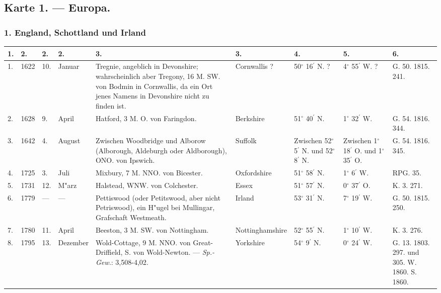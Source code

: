 \documentclass[a4paper, 8pt, oneside, polutonikogreek, german]{article}
\begin{document}
\subsection{Karte 1. --- Europa.}
\subsubsection{1. England, Schottland und Irland}
\begin{center}
    \footnotesize
    \begin{longtable}{|p{3mm}|p{10mm}|p{3mm}|p{15mm}|p{30mm}|p{25mm}|p{13mm}|p{13mm}|p{13mm}|}
    \hline
        1. & 2. & 2. & 2. & 3. & 3. & 4. & 5. & 6. \\ \hline
        1. & 1622 & 10. & Januar & Tregnie, angeblich in Devonshire; wahrscheinlich aber Tregony, 16 M. SW. von Bodmin in Cornwallis, da ein Ort jenes Namens in Devonshire nicht zu finden ist. & Cornwallis ? & 50$^\circ$ 16$^\prime$ N. ? & 4$^\circ$ 55$^\prime$ W. ? & G. 50. 1815. 241. \\ \hline
        2. & 1628 & 9. & April & Hatford, 3 M. O. von Faringdon. & Berkshire & 51$^\circ$ 40$^\prime$ N. & 1$^\circ$ 32$^\prime$ W. & G. 54. 1816. 344. \\ \hline
        3. & 1642 & 4. & August & Zwischen Woodbridge und Alborow (Alborough, Aldeburgh oder Aldborough), ONO. von Ipswich. & Suffolk & Zwischen 52$^\circ$ 5$^\prime$ N. und 52$^\circ$ 8$^\prime$ N. & Zwischen 1$^\circ$ 18$^\prime$ O. und 1$^\circ$ 35$^\prime$ O. & G. 54. 1816. 345. \\ \hline
        4. & 1725 & 3. & Juli & Mixbury, 7 M. NNO. von Bicester. & Oxfordshire & 51$^\circ$ 58$^\prime$ N. & 1$^\circ$ 6$^\prime$ W. & RPG. 35. \\ \hline
        5. & 1731 & 12. & M"arz & Halstead, WNW. von Colchester. & Essex & 51$^\circ$ 57$^\prime$ N. & 0$^\circ$ 37$^\prime$ O. & K. 3. 271. \\ \hline
        6. & 1779 & --- & --- & Pettiswood (oder Petitswood, aber nicht Petriswood), ein H"ugel bei Mullingar, Grafschaft Westmeath. & Irland & 53$^\circ$ 31$^\prime$ N. & 7$^\circ$ 19$^\prime$ W. & G. 50. 1815. 250. \\ \hline
        7. & 1780 & 11. & April & Beeston, 3 M. SW. von Nottingham. & Nottinghamshire & 52$^\circ$ 55$^\prime$ N. & 1$^\circ$ 10$^\prime$ W. & K. 3. 276. \\ \hline
        8. & 1795 & 13. & Dezember & Wold-Cottage, 9 M. NNO. von Great-Driffield, S. von Wold-Newton. --- \emph{Sp.-Gew.}: 3,508-4,02. & Yorkshire & 54$^\circ$ 9$^\prime$ N. & 0$^\circ$ 24$^\prime$ W. & G. 13. 1803. 297. und 305. W. 1860. S. 1860. \\ \hline

\end{longtable}
\end{center}
\end{document}
